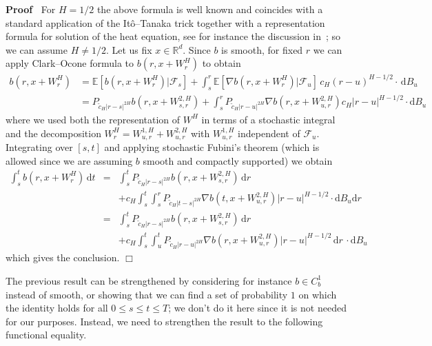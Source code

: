 \documentclass[10pt]{article}
\newcommand{\mathd}{\mathrm{d}}
\newcommand{\nobracket}{}
\newenvironment{proof}{\noindent\textbf{Proof\ }}{\hspace*{\fill}$\Box$\medskip}
\begin{document}
\begin{proof}
  For $H = 1 / 2$ the above formula is well known and coincides with a
  standard application of the It\^o--Tanaka trick together with a representation
  formula for solution of the heat equation, see for instance the discussion
  in~{\cite{coutin}}; so we can assume $H \neq 1 / 2$. Let us fix $x \in
  \mathbb{R}^d$. Since $b$ is smooth, for fixed $r$ we can apply Clark--Ocone
  formula to $b (r, x + W^H_r)$ to obtain
  \begin{align*}
    b (r, x + W^H_r) &= \mathbb{E} [b (r, x + W^H_r) | \mathcal{F}_s
    \nobracket] + \int_s^r \mathbb{E} [\nabla b (r, x + W^H_r) | \mathcal{F}_u
    \nobracket] \, c_H (r - u)^{H - 1 / 2} \cdot \, \mathd B_u\\
    & = P_{\tilde{c}_H | r - s |^{2 H}} b (r, x + W^{2, H}_{s, r}) +
    \int_s^r P_{\tilde{c}_H | r - u |^{2 H}} \nabla b (r, x + W^{2, H}_{u, r})
    c_H | r - u |^{H - 1 / 2} \cdot \mathd B_u
  \end{align*}
  where we used both the representation of $W^H$ in terms of a stochastic
  integral and the decomposition $W^H_r = W^{1, H}_{u, r} + W^{2, H}_{u, r}$
  with $W^{1, H}_{u, r}$ independent of $\mathcal{F}_u$. Integrating over $[s,
  t]$ and applying stochastic Fubini's theorem (which is allowed since we are
  assuming $b$ smooth and compactly supported) we obtain
  \begin{eqnarray*}
    \int_s^t b (r, x + W^H_r) \, \mathd t & = & \int_s^t P_{\tilde{c}_H | r -
    s |^{2 H}} b (r, x + W^{2, H}_{s, r}) \, \mathd r\\
    &  & + c_H \int_s^t \int_s^r P_{\tilde{c}_H | t - s |^{2 H}} \nabla b (t,
    x + W^{2, H}_{u, r}) | r - u |^{H - 1 / 2} \cdot \mathd B_u \mathd r\\
    & = & \int_s^t P_{\tilde{c}_H | r - s |^{2 H}} b (r, x + W^{2, H}_{s, r})
    \, \mathd r\\
    &  & + c_H \int_s^t \int_u^t P_{\tilde{c}_H | r - u |^{2 H}} \nabla b (r,
    x + W^{2, H}_{u, r}) | r - u |^{H - 1 / 2} \, \mathd r \, \cdot \mathd B_u
  \end{eqnarray*}
  which gives the conclusion.
\end{proof}

The previous result can be strengthened by considering for instance $b \in
C_b^1$ instead of smooth, or showing that we can find a set of probability $1$
on which the identity holds for all $0 \leqslant s \leqslant t \leqslant T$;
we don't do it here since it is not needed for our purposes. Instead, we need
to strengthen the result to the following functional equality.
\end{document}

